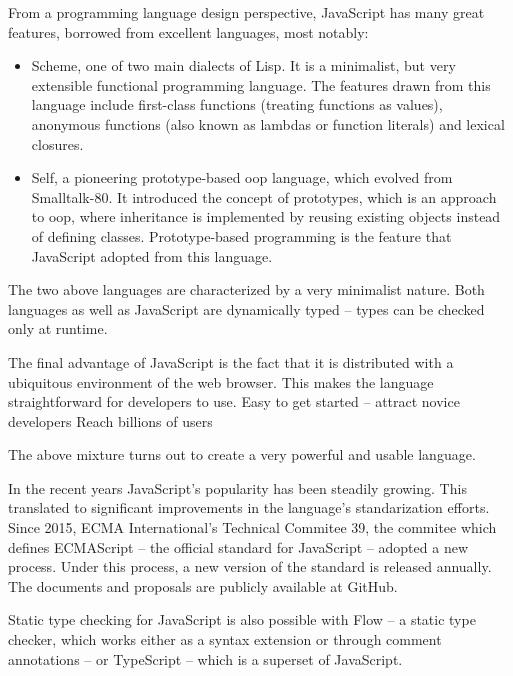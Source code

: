 From a programming language design perspective, JavaScript has many great
features, borrowed from excellent languages\cite[Section~4~Overview]{ecmascript}, most notably:
\begin{itemize}
   \item Scheme, one of two main dialects of Lisp\cite{r7rs}. It is a minimalist, but very extensible functional programming language. The features drawn from this language include first-class functions (treating functions as values), anonymous functions (also known as lambdas or function literals) and lexical closures.
   \item Self, a pioneering prototype-based \acrlong{oop} language\cite{self_handbook}, which evolved from Smalltalk-80\cite{smalltalk_history}. It introduced the concept of prototypes, which is an approach to \acrshort{oop}, where inheritance is implemented by reusing existing objects instead of defining classes. Prototype-based programming is the feature that JavaScript adopted from this language.
\end{itemize}

The two above languages are characterized by a very minimalist nature.
Both languages as well as JavaScript\cite{js_types} are dynamically typed -- types can be checked only at runtime. 

The final advantage of JavaScript is the fact that it is distributed with a ubiquitous environment of the web browser. This makes the language straightforward for developers to use.
Easy to get started -- attract novice developers
Reach billions of users\cite{internet_stats}

The above mixture turns out to create a very powerful and usable language.


In the recent years JavaScript's popularity has been steadily growing\cite{js_growth}. This translated to significant improvements in the language's standarization efforts. Since 2015, ECMA International's\cite{ecma} Technical Commitee 39\cite{tc39}, the commitee which defines ECMAScript -- the official standard for JavaScript -- adopted a new process. Under this process, a new version of the standard is released annually\cite{ecmascript, ecmascript_2015, ecmascript_2017}. The documents and proposals are publicly available at GitHub\cite{ecma_github}.


Static type checking for JavaScript is also possible with Flow\cite{js_flow} -- a static type checker, which works either as a syntax extension or through comment annotations -- or TypeScript\cite{typescript} -- which is a superset of JavaScript.


